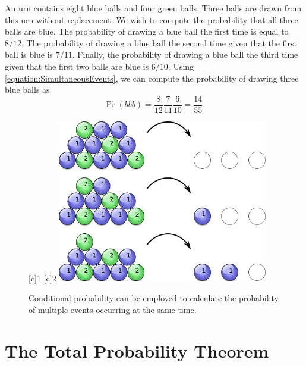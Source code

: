 \begin{example}
An urn contains eight blue balls and four green balls.
Three balls are drawn from this urn without replacement.
We wish to compute the probability that all three balls are blue.
The probability of drawing a blue ball the first time is equal to $8/12$.
The probability of drawing a blue ball the second time given that the first ball is blue is $7/11$.
Finally, the probability of drawing a blue ball the third time given that the first two balls are blue is $6/10$.
Using \eqref{equation:SimultaneousEvents}, we can compute the probability of drawing three blue balls as
\begin{equation*}
\Pr (bbb)
= \frac{8}{12} \frac{7}{11} \frac{6}{10}
= \frac{14}{55} .
\end{equation*}

\begin{figure}[htb!]
\begin{center}
\begin{psfrags}
[c]{$1$}
[c]{$2$}
\includegraphics[height=7.11cm]{Figures/3Chapter/balls}
\end{psfrags}
\caption{Conditional probability can be employed to calculate the probability of multiple events occurring at the same time.}
\label{figure:Balls}
\end{center}
\end{figure}
\end{example}


\section{The Total Probability Theorem}

